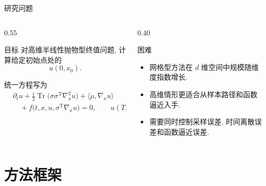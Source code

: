 \documentclass[aspectratio=169, 10pt, fontset=fandol]{ctexbeamer}
\newcommand\T{\operatorname{T}}
\begin{document}
\begin{frame}{研究问题}
  \begin{columns}[T,onlytextwidth]
    \begin{column}{0.55\textwidth}
      \begin{block}{目标}
        对高维半线性抛物型终值问题, 计算给定初始点处的
        \begin{equation*}
          u(0,x_0).
        \end{equation*}
      \end{block}
      \vspace{0.2cm}
      统一方程写为
      \begin{equation*}
      \begin{aligned}
        &\partial_t u
        + \frac12 \operatorname{Tr}\!\bigl(\sigma\sigma^{\T}\nabla_x^2u\bigr)
        + \langle \mu,\nabla_x u\rangle \\
        &\quad + f\!\bigl(t,x,u,\sigma^{\T}\nabla_xu\bigr)=0,
        \qquad
        u(T,x)=g(x).
      \end{aligned}
      \end{equation*}
    \end{column}
    \begin{column}{0.40\textwidth}
      \begin{block}{困难}
        \begin{itemize}
          \item 网格型方法在 $d$ 维空间中规模随维度指数增长.
          \item 高维情形更适合从样本路径和函数逼近入手.
          \item 需要同时控制采样误差, 时间离散误差和函数逼近误差.
        \end{itemize}
      \end{block}
    \end{column}
  \end{columns}
\end{frame}

\section{方法框架}
\end{document}
